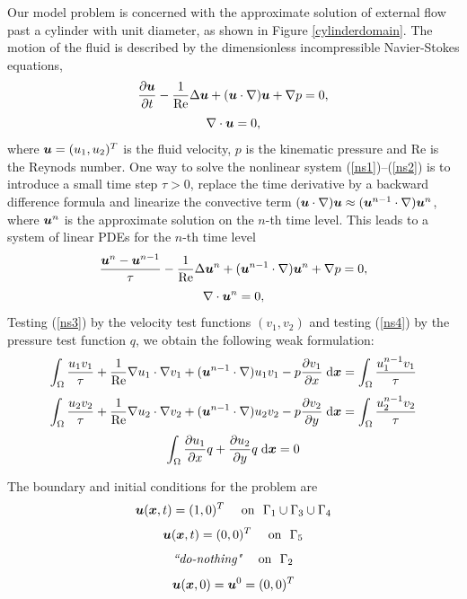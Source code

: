 Our model problem is concerned with the approximate solution of external flow past
a cylinder with unit diameter, as shown in Figure \ref{cylinderdomain}. The motion of the
fluid is described by the dimensionless incompressible Navier-Stokes equations,
\begin{equation} \label{ns1}
  \frac{\partial \mbox{\boldmath $u$}}{\partial t} - \frac{1}{\rm Re} \Delta \mbox{\boldmath $u$} + (\mbox{\boldmath $u$} \cdot \nabla) \mbox{\boldmath $u$} + \nabla p  = 0,
\end{equation}
\begin{equation} \label{ns2}
  \nabla \cdot \mbox{\boldmath $u$} = 0,
\end{equation}
where $\mbox{\boldmath $u$} = (u_1, u_2)^T$ is the fluid velocity, $p$ is the kinematic pressure and Re
is the Reynods number. One way to solve the nonlinear system (\ref{ns1})--(\ref{ns2}) is to
introduce a small time step $\tau > 0$, replace the time derivative by a backward
difference formula and linearize the convective term
$(\mbox{\boldmath $u$} \cdot \nabla) \mbox{\boldmath $u$} \approx (\mbox{\boldmath $u$}^{n-1} \cdot \nabla) \mbox{\boldmath $u$}^n$, where $\mbox{\boldmath $u$}^n$ is the
approximate solution on the $n$-th time level. This leads to a system of linear PDEs for the
$n$-th time level
\begin{equation} \label{ns3}
  \frac{\mbox{\boldmath $u$}^n - \mbox{\boldmath $u$}^{n-1}}{\tau} - \frac{1}{\rm Re} \Delta \mbox{\boldmath $u$}^n +
    (\mbox{\boldmath $u$}^{n-1} \cdot \nabla) \mbox{\boldmath $u$}^n + \nabla p  = 0,
\end{equation}
\begin{equation} \label{ns4}
  \nabla \cdot \mbox{\boldmath $u$}^n = 0,
\end{equation}
Testing (\ref{ns3}) by the velocity test functions $(v_1, v_2)$ and testing (\ref{ns4})
by the pressure test function $q$, we obtain the following weak formulation:
$$\int_\Omega \frac{u_1 v_1}{\tau} +
  \frac{1}{\rm Re} \nabla u_1 \cdot \nabla v_1 +
  (\mbox{\boldmath $u$}^{n-1} \cdot \nabla) u_1 v_1 - p \frac{\partial v_1}{\partial x} \;\mbox{d}\mbox{\boldmath $x$}
  = \int_\Omega \frac{u^{n-1}_1 v_1}{\tau} $$
$$\int_\Omega \frac{u_2 v_2}{\tau} +
  \frac{1}{\rm Re} \nabla u_2 \cdot \nabla v_2 +
  (\mbox{\boldmath $u$}^{n-1} \cdot \nabla) u_2 v_2 - p \frac{\partial v_2}{\partial y} \;\mbox{d}\mbox{\boldmath $x$}
  = \int_\Omega \frac{u^{n-1}_2 v_2}{\tau} $$
$$\int_\Omega \frac{\partial u_1}{\partial x} q + \frac{\partial u_2}{\partial y} q \;\mbox{d}\mbox{\boldmath $x$} = 0 $$

The boundary and initial conditions  for the problem are
$$\bfu(\bfx, t) = (1, 0)^T \ \ \ \ \mbox{on}\ \ \Gamma_1 \cup \Gamma_3 \cup \Gamma_4$$
$$\bfu(\bfx, t) = (0, 0)^T \ \ \ \ \mbox{on}\ \ \Gamma_5$$
$$\mbox{\it ``do-nothing"}\ \ \ \ \mbox{on}\ \ \Gamma_2$$
\begin{equation} \mbox{\boldmath $u$}(\mbox{\boldmath $x$}, 0) = \mbox{\boldmath $u$}^0 = (0, 0)^T \label{ns:initial} \end{equation}

